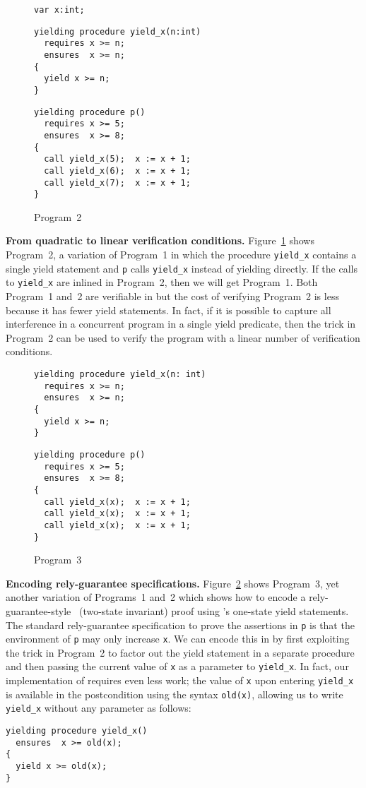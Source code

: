 \begin{figure}
\begin{verbatim}
var x:int;
\end{verbatim}
\begin{verbatim}
yielding procedure yield_x(n:int)
  requires x >= n;
  ensures  x >= n;
{
  yield x >= n;
}
\end{verbatim}
\begin{verbatim}
yielding procedure p()
  requires x >= 5;
  ensures  x >= 8;
{
  call yield_x(5);  x := x + 1;
  call yield_x(6);  x := x + 1;
  call yield_x(7);  x := x + 1;
}
\end{verbatim}
\caption{Program~2}
\label{fig:ex2}
\end{figure}

{\bf From quadratic to linear verification conditions.}
Figure~\ref{fig:ex2} shows Program~2, a variation of Program~1 in which the procedure {\tt yield\_x} 
contains a single yield statement and {\tt p} calls {\tt yield\_x} instead of yielding directly.
If the calls to {\tt yield\_x} are inlined in Program~2, then we will get Program~1.
Both Program~1 and~2 are verifiable in \civl but the cost of verifying Program~2 is less because it has fewer yield statements.
In fact, if it is possible to capture all interference in a concurrent program in a single yield predicate, 
then the trick in Program~2 can be used to verify the program with a linear number of verification conditions.

\begin{figure}
\begin{verbatim}
yielding procedure yield_x(n: int)
  requires x >= n;
  ensures  x >= n;
{
  yield x >= n;
}
\end{verbatim}
\begin{verbatim}
yielding procedure p()
  requires x >= 5;
  ensures  x >= 8;
{
  call yield_x(x);  x := x + 1;
  call yield_x(x);  x := x + 1;
  call yield_x(x);  x := x + 1;
}
\end{verbatim}
\caption{Program~3}
\label{fig:ex3}
\end{figure}

{\bf Encoding rely-guarantee specifications.}
Figure~\ref{fig:ex3} shows Program~3, yet another variation of Programs~1 and~2 which shows how to encode a rely-guarantee-style~\cite{Jones83} (two-state invariant)
proof using \civl's one-state yield statements. 
The standard rely-guarantee specification to prove the assertions in {\tt p} is that the environment of {\tt p} 
may only increase {\tt x}.
We can encode this in \civl by first exploiting the trick in Program~2 to factor out the yield statement in a separate procedure
and then passing the current value of {\tt x} as a parameter to {\tt yield\_x}.
In fact, our implementation of \civl requires even less work; the value of {\tt x} upon entering {\tt yield\_x} is available 
in the postcondition using the syntax {\tt old(x)}, allowing us to write {\tt yield\_x} without any parameter as follows:
\begin{verbatim}
yielding procedure yield_x()
  ensures  x >= old(x);
{
  yield x >= old(x);
}
\end{verbatim}

